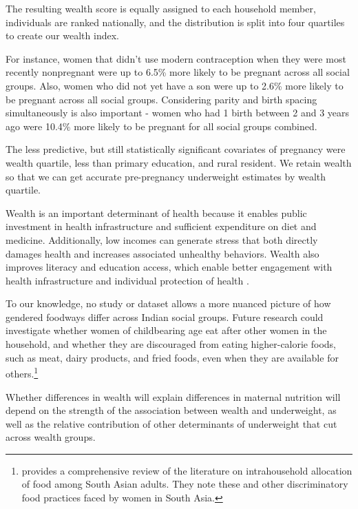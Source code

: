 The resulting wealth score is equally assigned to each household member, individuals are ranked nationally, and the distribution is split into four quartiles to create our wealth index.

For instance, women that didn't use modern contraception when they were most recently nonpregnant were up to 6.5\% more likely to be pregnant across all social groups. Also, women who did not yet have a son were up to 2.6\% more likely to be pregnant across all social groups. Considering parity and birth spacing simultaneously is also important - women who had 1 birth between 2 and 3 years ago were 10.4\% more likely to be pregnant for all social groups combined.

The less predictive, but still statistically significant covariates of pregnancy were wealth quartile, less than primary education, and rural resident. We retain wealth so that we can get accurate pre-pregnancy underweight estimates by wealth quartile. 


Wealth is an important determinant of health because it enables public investment in health infrastructure and sufficient expenditure on diet and medicine. Additionally, low incomes can generate stress that both directly damages health and increases associated unhealthy behaviors. Wealth also improves literacy and education access, which enable better engagement with health infrastructure and individual protection of health \citep{rajan2013wealthier}. 


To our knowledge, no study or dataset allows a more nuanced picture of how gendered foodways differ across Indian social groups.  Future research could investigate whether  women of childbearing age eat after other women in the household, and whether they are discouraged from eating higher-calorie foods, such as meat, dairy products, and fried foods, even when they are available for others.\footnote{\cite{harris2017determinants} provides a comprehensive review of the literature on intrahousehold allocation of food among South Asian adults.  They note these and other discriminatory food practices faced by women in South Asia.}  


Whether differences in wealth will explain differences in maternal nutrition will depend on the strength of the association between wealth and underweight, as well as the relative contribution of other determinants of underweight that cut across wealth groups. 


